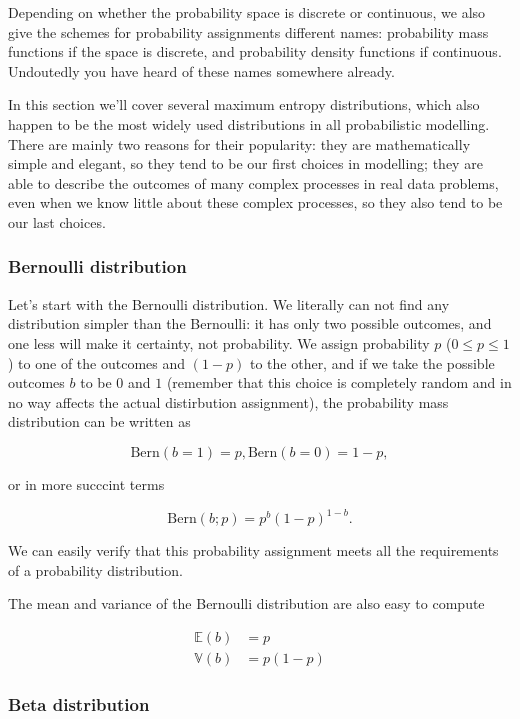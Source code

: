 \documentclass[11pt]{article}
\begin{document}
Depending on whether the probability space is discrete or continuous, we also give the schemes for probability assignments different names: probability mass functions if the space is discrete, and probability density functions if continuous. Undoutedly you have heard of these names somewhere already.

In this section we'll cover several maximum entropy distributions, which also happen to be the most widely used distributions in all probabilistic modelling. There are mainly two reasons for their popularity: they are mathematically simple and elegant, so they tend to be our first choices in modelling; they are able to describe the outcomes of many complex processes in real data problems, even when we know little about these complex processes, so they also tend to be our last choices.

\subsubsection{Bernoulli distribution}
\label{sec:org305d9b1}

Let's start with the Bernoulli distribution. We literally can not find any distribution simpler than the Bernoulli: it has only two possible outcomes, and one less will make it certainty, not probability. We assign probability \(p\) (\(0 \leq p \leq 1\)) to one of the outcomes and \((1-p)\) to the other, and if we take the possible outcomes \(b\) to be \(0\) and \(1\) (remember that this choice is completely random and in no way affects the actual distirbution assignment), the probability mass distribution can be written as

$$ \text{Bern}(b=1) = p, \text{Bern}(b=0)=1-p,$$

or in more succcint terms

$$ \text{Bern}(b; p) = p^b (1-p)^{1-b}.$$

We can easily verify that this probability assignment meets all the requirements of a probability distribution.

The mean and variance of the Bernoulli distribution are also easy to compute

\begin{align*}
\mathbb{E}(b) &= p \\
\mathbb{V}(b) &= p(1-p)
\end{align*}

\subsubsection{Beta distribution}
\label{sec:org18d26a0}
\end{document}
